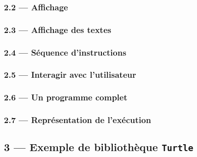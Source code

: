 \documentclass[a4paper,17pt]{extarticle}
\begin{document}
    \hypertarget{affichage}{%
\subsubsection{2.2 --- Affichage}\label{affichage}}

    \hypertarget{affichage-des-textes}{%
\subsubsection{2.3 --- Affichage des
textes}\label{affichage-des-textes}}

    \hypertarget{suxe9quence-dinstructions}{%
\subsubsection{2.4 --- Séquence
d'instructions}\label{suxe9quence-dinstructions}}

    

    \hypertarget{interagir-avec-lutilisateur}{%
\subsubsection{2.5 --- Interagir avec
l'utilisateur}\label{interagir-avec-lutilisateur}}

    \hypertarget{un-programme-complet}{%
\subsubsection{2.6 --- Un programme
complet}\label{un-programme-complet}}

    \hypertarget{repruxe9sentation-de-lexuxe9cution}{%
\subsubsection{2.7 --- Représentation de
l'exécution}\label{repruxe9sentation-de-lexuxe9cution}}

    \hypertarget{exemple-de-bibliothuxe8que-turtle}{%
\subsection{\texorpdfstring{3 --- Exemple de bibliothèque
\texttt{Turtle}}{3 --- Exemple de bibliothèque Turtle}}\label{exemple-de-bibliothuxe8que-turtle}}

    


    
    
    
\end{document}

